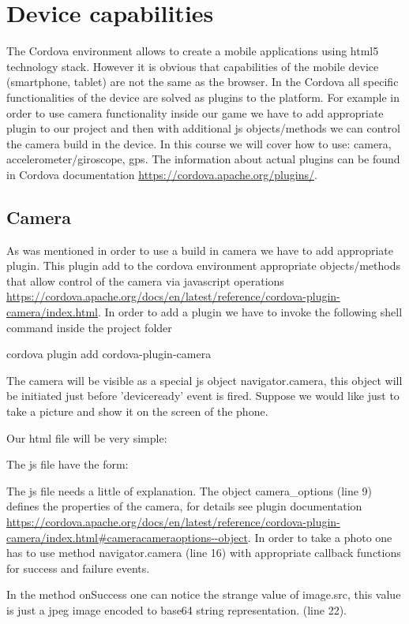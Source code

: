 \chapter{Device capabilities}

The Cordova environment allows to create a mobile applications using html5 technology stack. However it is obvious that capabilities of the mobile device (smartphone, tablet) are not the same as the browser. In the Cordova all specific functionalities of the device are solved as plugins to the platform. For example in order to use camera functionality inside our game we have to add appropriate plugin to our project and then with additional js objects/methods we can control the camera build in the device. In this course we will cover how to use: camera, accelerometer/giroscope, gps. The information about actual plugins can be found in Cordova documentation \url{https://cordova.apache.org/plugins/}.

\section{Camera}
As was mentioned in order to use a build in camera we have to add appropriate plugin. This plugin add to the cordova environment appropriate objects/methods that allow control of the camera via javascript operations \url{https://cordova.apache.org/docs/en/latest/reference/cordova-plugin-camera/index.html}. In order to add a plugin we have to invoke the following shell command inside the project folder

\begin{shell}
cordova plugin add cordova-plugin-camera
\end{shell}

The camera will be visible as a special js object navigator.camera, this object will be initiated just before 'deviceready' event is fired. Suppose we would like just to take a picture and show it on the screen of the phone.

Our html file will be very simple:


The js file have the form:


\begin{explain}
  The js file needs a little of explanation.
  The object camera\_options (line 9) defines the properties of the camera, for details see plugin documentation \url{https://cordova.apache.org/docs/en/latest/reference/cordova-plugin-camera/index.html#cameracameraoptions--object}. In order to take a photo one has to use method navigator.camera (line 16) with appropriate callback functions for success and failure events.

  In the method onSuccess one can notice the strange value of image.src, this value is just a jpeg image encoded to base64 string representation. (line 22).

\end{explain}
